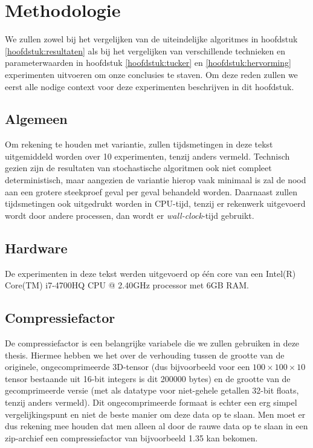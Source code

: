 \chapter{Methodologie}
\label{hoofdstuk:methodologie}

We zullen zowel bij het vergelijken van de uiteindelijke algoritmes in hoofdstuk \ref{hoofdstuk:resultaten} als bij het vergelijken van verschillende technieken en parameterwaarden in hoofdstuk \ref{hoofdstuk:tucker} en \ref{hoofdstuk:hervorming} experimenten uitvoeren om onze conclusies te staven. Om deze reden zullen we eerst alle nodige context voor deze experimenten beschrijven in dit hoofdstuk.

\section{Algemeen}

Om rekening te houden met variantie, zullen tijdsmetingen in deze tekst uitgemiddeld worden over 10 experimenten, tenzij anders vermeld. Technisch gezien zijn de resultaten van stochastische algoritmen ook niet compleet deterministisch, maar aangezien de variantie hierop vaak minimaal is zal de nood aan een grotere steekproef geval per geval behandeld worden. Daarnaast zullen tijdsmetingen ook uitgedrukt worden in CPU-tijd, tenzij er rekenwerk uitgevoerd wordt door andere processen, dan wordt er \textit{wall-clock}-tijd gebruikt.

\section{Hardware}

De experimenten in deze tekst werden uitgevoerd op \'e\'en core van een Intel(R) Core(TM) i7-4700HQ CPU @ 2.40GHz processor met 6GB RAM.

\section{Compressiefactor}

De compressiefactor is een belangrijke variabele die we zullen gebruiken in deze thesis. Hiermee hebben we het over de verhouding tussen de grootte van de originele, ongecomprimeerde 3D-tensor (dus bijvoorbeeld voor een $100 \times 100 \times 10$ tensor bestaande uit 16-bit integers is dit 200000 bytes) en de grootte van de gecomprimeerde versie (met als datatype voor niet-gehele getallen 32-bit floats, tenzij anders vermeld). Dit ongecomprimeerde formaat is echter een erg simpel vergelijkingspunt en niet de beste manier om deze data op te slaan. Men moet er dus rekening mee houden dat men alleen al door de rauwe data op te slaan in een zip-archief een compressiefactor van bijvoorbeeld 1.35 kan bekomen.\\

